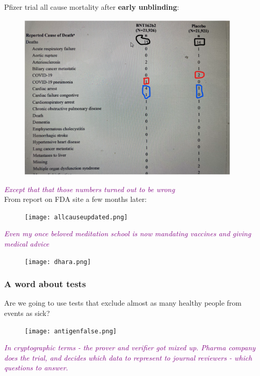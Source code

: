 \documentclass[shadesubsections,compress,14pt,mathserif]{beamer}
\newcommand{\stitle}[1]{{\large{\textcolor{purple}{\emph{#1}}}}}
\begin{document}
\begin{frame}
Pfizer trial all cause mortality after \textbf{early unblinding}:
 \begin{figure}
  \includegraphics[width=300pt]{pfizerinitialallcausemortality.png}
\end{figure}

\end{frame}
\begin{frame}
 \stitle{Except that that those numbers turned out to be wrong}\\
 From  report on FDA site a few months later:
 \begin{figure}
  \texttt{[image: allcauseupdated.png]}
\end{figure}
 
\end{frame}
\begin{frame}
 \stitle{Even my once beloved meditation school is now mandating vaccines and giving medical advice}\\
 \begin{figure}
  \texttt{[image: dhara.png]}
\end{figure}
 
\end{frame}
\begin{frame}
\frametitle{A word about tests}
Are we going to use tests that exclude almost as many healthy people from events as sick?
 \begin{figure}
  \texttt{[image: antigenfalse.png]}
\end{figure}
 
\end{frame}
\begin{frame}
\stitle{In cryptographic terms - the prover and verifier got mixed up. Pharma company does the trial, and decides which
data to represent to journal reviewers - which questions to answer.}
\end{frame}
\end{document}
